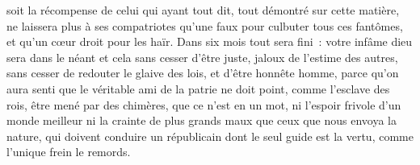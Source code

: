\documentclass[french,twoside]{book} %
\def\mednobreak{\ifdim\lastskip<\medskipamount
  \removelastskip\nopagebreak\medskip\fi}
\newcommand{\labelblock}[1]{\medbreak{\noindent\color{rubric}\bfseries #1}\par\mednobreak}
\begin{document}
soit la récompense de celui qui ayant tout dit, tout démontré sur cette matière, ne laissera plus à ses compatriotes qu’une faux pour culbuter tous ces fantômes, et qu’un cœur droit pour les haïr. Dans six mois tout sera fini : votre infâme dieu sera dans le néant et cela sans cesser d’être juste, jaloux de l’estime des autres, sans cesser de redouter le glaive des lois, et d’être honnête homme, parce qu’on aura senti que le véritable ami de la patrie ne doit point, comme l’esclave des rois, être mené par des chimères, que ce n’est en un mot, ni l’espoir frivole d’un monde meilleur ni la crainte de plus grands maux que ceux que nous envoya la nature, qui doivent conduire un républicain dont le seul guide est la vertu, comme l’unique frein le remords.\par

\labelblock{LES MŒURS}
\end{document}
